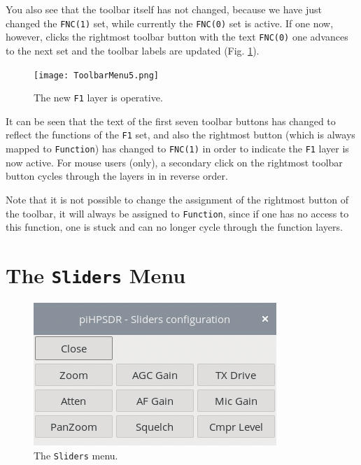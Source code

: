 \documentclass[12pt]{book}
\def\bltt#1{\texttt{\color{blue}#1}}
\begin{document}
You also see that the toolbar itself has not changed, because we have just changed the \texttt{FNC(1)} set,
while currently the \texttt{FNC(0)} set is active. If one now, however, clicks the rightmost
toolbar button with the text \texttt{FNC(0)} one advances to the next set and the toolbar labels
are updated (Fig. \ref{fig:ToolbarMenu5}).

\begin{figure}[ht!]
\center
\texttt{[image: ToolbarMenu5.png]}
\caption{The new \texttt{F1} layer is operative.}
\label{fig:ToolbarMenu5}
\end{figure}

It can be seen that the text of the first seven toolbar buttons has changed to reflect
the functions of the \texttt{F1} set, and also the rightmost button (which is always mapped
to \bltt{Function}) has changed to \texttt{FNC(1)} in order to indicate the \texttt{F1}
layer is now active. For mouse users (only), a secondary click on the rightmost toolbar
button cycles through the layers in in reverse order.

Note that it is not possible to change the assignment of the  rightmost button of the toolbar,
it will always be assigned to \bltt{Function}, since if one has no access to this
function, one is stuck and can no longer cycle through the function layers.

\section{The \texttt{Sliders} Menu}

\begin{figure}[ht!]
\center
\includegraphics[scale=0.45]{SlidersMenu.png}
\caption{The \bltt{Sliders} menu.}
\label{fig:SlidersMenu}
\end{figure}
\end{document}
